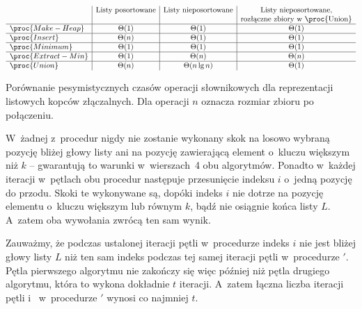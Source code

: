 \begin{table}[ht]
	\begin{center}
		\[
			\begin{array}{l|c|c|c}
				& \text{Listy posortowane} & \text{Listy nieposortowane} & \text{Listy nieposortowane,} \\
				&  &  & \text{rozłączne zbiory w~\proc{Union}} \\
				\hline
				\proc{Make-Heap} & \Theta(1) & \Theta(1) & \Theta(1) \\
				\hline
				\proc{Insert} & \Theta(n) & \Theta(1) & \Theta(1) \\
				\hline
				\proc{Minimum} & \Theta(1) & \Theta(1) & \Theta(1) \\
				\hline
				\proc{Extract-Min} & \Theta(1) & \Theta(n) & \Theta(n) \\
				\hline
				\proc{Union} & \Theta(n) & \Theta(n\lg n) & \Theta(1)
			\end{array}
		\]
	\end{center}
	\caption{Porównanie pesymistycznych czasów operacji słownikowych dla reprezentacji listowych kopców złączalnych. Dla operacji  $n$ oznacza rozmiar zbioru po połączeniu.} \label{tab:10-2}
\end{table}


\subproblem %
W~żadnej z~procedur nigdy nie zostanie wykonany skok na losowo wybraną pozycję bliżej głowy listy ani na pozycję zawierającą element o~kluczu większym niż $k$ -- gwarantują to warunki w~wierszach~4 obu algorytmów. Ponadto w~każdej iteracji w~pętlach  obu procedur następuje przesunięcie indeksu $i$ o~jedną pozycję do przodu. Skoki te wykonywane są, dopóki indeks $i$ nie dotrze na pozycję elementu o~kluczu większym lub równym $k$, bądź nie osiągnie końca listy $L$. A~zatem oba wywołania zwrócą ten sam wynik.

Zauważmy, że podczas ustalonej iteracji pętli  w~procedurze  indeks $i$ nie jest bliżej głowy listy $L$ niż ten sam indeks podczas tej samej iteracji pętli  w~procedurze $'$. Pętla pierwszego algorytmu nie zakończy się więc później niż pętla drugiego algorytmu, która to wykona dokładnie $t$ iteracji. A~zatem łączna liczba iteracji pętli  i~ w~procedurze $'$ wynosi co najmniej $t$.

